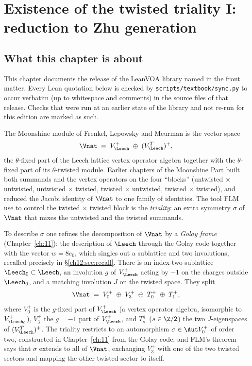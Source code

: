 \chapter{Existence of the twisted triality I: reduction to Zhu generation}\label{ch:12}

\providecommand{\chtwelveO}{\mathcal{O}}
\providecommand{\chtwelveG}{\mathcal{G}}

\section{What this chapter is about}\label{ch12:sec:intro}

This chapter documents the release of the LeanVOA library named in the front matter. Every Lean quotation below is checked by \texttt{scripts/textbook/sync.py} to occur verbatim (up to whitespace and comments) in the source files of that release. Checks that were run at an earlier state of the library and not re-run for this edition are marked as such.

The Moonshine module of Frenkel, Lepowsky and Meurman is the vector space
\begin{equation*}
  \Vnat \;=\; V_\Leech^{+}\;\oplus\;(V_\Leech^{T})^{+},
\end{equation*}
the $\theta$-fixed part of the Leech lattice vertex operator algebra together with the $\theta$-fixed
part of its $\theta$-twisted module.  Earlier chapters of the Moonshine Part built both summands and
the vertex operators on the four ``blocks'' (untwisted $\times$ untwisted, untwisted $\times$
twisted, twisted $\times$ untwisted, twisted $\times$ twisted), and reduced the Jacobi identity of
$\Vnat$ to one family of identities.  The tool FLM use to control the twisted $\times$ twisted block
is the \emph{triality}: an extra symmetry $\sigma$ of $\Vnat$ that mixes the untwisted and the twisted
summands.

To describe $\sigma$ one refines the decomposition of $\Vnat$ by a \emph{Golay frame}
(Chapter~\ref{ch:11}): the description of $\Leech$ through the Golay code together with the vector
$w=8e_0$, which singles out a sublattice and two involutions, recalled precisely in \S\ref{ch12:sec:recall}.  There is an index-two sublattice $\Leech_0\subset\Leech$, an involution $g$ of
$V_\Leech^+$ acting by $-1$ on the charges outside $\Leech_0$, and a matching involution $J$ on the
twisted space.  They split
\begin{equation}\label{ch12:eq:fourblocks}
  \Vnat \;=\; V_0^{+}\;\oplus\;V_3^{+}\;\oplus\;T_0^{+}\;\oplus\;T_1^{+},
\end{equation}
where $V_0^+$ is the $g$-fixed part of $V_\Leech^+$ (a vertex operator algebra, isomorphic to
$V_{\Leech_0}^+$), $V_3^+$ the $g=-1$ part of $V_\Leech^+$, and $T_s^+$ ($s\in\Z/2$) the two
$J$-eigenspaces of $(V_\Leech^T)^+$.  The triality restricts to an automorphism $\sigma\in\Aut V_0^+$
of order two, constructed in Chapter~\ref{ch:11} from the Golay code, and FLM's theorem says that
$\sigma$ extends to all of $\Vnat$, exchanging $V_3^+$ with one of the two twisted sectors and mapping
the other twisted sector to itself.

